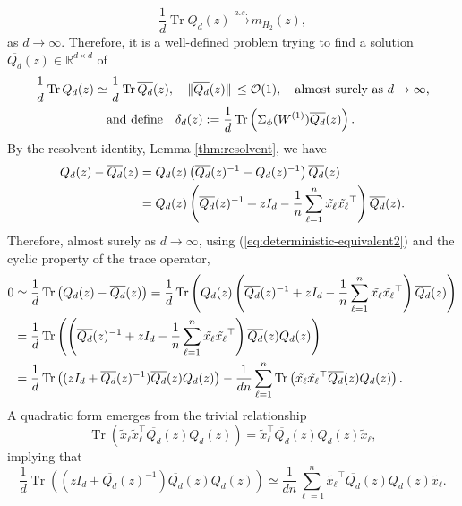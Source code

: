 \documentclass{article}
\begin{document}
$$\frac{1}{d}\operatorname{Tr}Q_d(z)\stackrel{a.s.}{\to}m_{H_2}(z),$$
as $d\to\infty$. Therefore, it is a well-defined problem trying to find a solution $\overline{Q_d}(z)\in\mathbb{R}^{d\times d}$ of
\begin{align}
\frac{1}{d}\operatorname{Tr}Q_{d}(z)&\simeq\frac{1}{d}\operatorname{Tr}\overline{Q_{d}}(z),\quad\|\overline{Q_d}(z)\|\,\leq\mathcal{O}(1),\quad\text{almost surely as $d\to\infty$,} \label{eq:deterministic-equivalent2}
\\ &\quad\text{and define}\quad \delta_d(z):=\frac{1}{d}\operatorname{Tr}\left(\Sigma_\phi(W^{(1)})\overline{Q_d}(z)\right). \notag
\end{align}
By the resolvent identity, Lemma \ref{thm:resolvent}, we have
\begin{align}
Q_{d}(z)-\overline{Q_{d}}(z) &= Q_{d}(z)\left(\overline{Q_{d}}(z)^{-1}-Q_{d}(z)^{-1}\right)\overline{Q_{d}}(z) \notag
\\ &= Q_{d}(z)\left(\overline{Q_{d}}(z)^{-1}+zI_{d}-\frac{1}{n}\sum_{\ell=1}^n\tilde{x_\ell}\tilde{x_\ell}^\top\right)\overline{Q_{d}}(z).
\end{align}
Therefore, almost surely as $d\to\infty$, using (\ref{eq:deterministic-equivalent2}) and the cyclic property of the trace operator,
\begin{align}
0&\simeq\frac{1}{d}\operatorname{Tr}\left(Q_d(z)-\overline{Q_d}(z)\right) =\frac{1}{d}\operatorname{Tr}\left(Q_{d}(z)\left(\overline{Q_{d}}(z)^{-1}+zI_{d}-\frac{1}{n}\sum_{\ell=1}^n\tilde{x_\ell}\tilde{x_\ell}^\top\right)\overline{Q_{d}}(z)\right) \notag
\\&= \frac{1}{d}\operatorname{Tr}\left(\left(\overline{Q_{d}}(z)^{-1}+zI_{d}-\frac{1}{n}\sum_{\ell=1}^n\tilde{x_\ell}\tilde{x_\ell}^\top\right)\overline{Q_{d}}(z)Q_{d}(z)\right) \notag
\\&= \frac{1}{d}\operatorname{Tr}\left((zI_{d}+\overline{Q_{d}}(z)^{-1})\overline{Q_{d}}(z)Q_{d}(z)\right)-\frac{1}{dn}\sum_{\ell=1}^n\operatorname{Tr}\left(\tilde{x_\ell}\tilde{x_\ell}^\top\overline{Q_d}(z)Q_d(z)\right).
\end{align}
A quadratic form emerges from the trivial relationship
\begin{equation}
\operatorname{Tr}(\tilde{x}_\ell \tilde{x}_\ell^\top\overline{Q_d}(z)Q_d(z)) =\tilde{x}_\ell^\top\overline{Q_d}(z)Q_d(z)\tilde{x}_\ell,
\end{equation}
implying that
\begin{equation}
\frac{1}{d}\operatorname{Tr}\left((zI_{d}+\overline{Q_{d}}(z)^{-1})\overline{Q_{d}}(z)Q_{d}(z)\right)\simeq \frac{1}{dn}\sum_{\ell=1}^n \tilde{x_\ell}^\top\overline{Q_{d}}(z)Q_{d}(z)\tilde{x_\ell}.\label{eq:trace-sim2c}
\end{equation}
\end{document}
